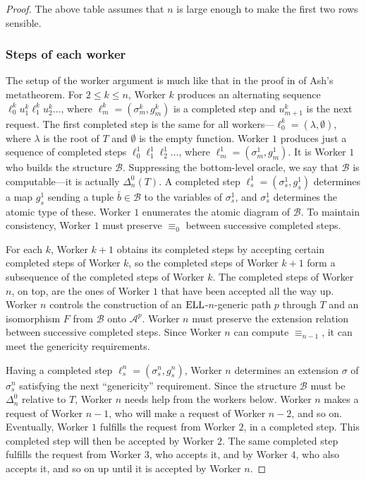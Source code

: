 \documentclass{article}
\newcommand{\ELL}{\textnormal{ELL}}
\theoremstyle{definition}
\begin{document}
\begin{proof}
		The above table assumes that $n$ is large enough to make the first two rows sensible.
		
		\subsubsection{Steps of each worker}
		
		The setup of the worker argument is much like that in the proof in \cite{AK00} of Ash's metatheorem. For $2\leq k\leq n$, Worker $k$ produces an alternating sequence 
		$\ell^k_0u^k_1\ell^k_1u^k_2\ldots $, where $\ell^k_m = (\sigma^k_m,g^k_m)$ is a completed step and $u^k_{m+1}$ is the next request. The first completed step is the same for all workers---$\ell^k_0 = (\lambda,\emptyset)$, where $\lambda$ is the root of $T$ and $\emptyset$ is the empty function.
		Worker $1$ produces just a sequence of completed steps $\ell^1_0\ell^1_1\ell^1_2\ldots$, where $\ell^1_m = (\sigma^1_m,g^1_m)$. It is Worker $1$ who builds the structure $\mathcal{B}$. Suppressing the bottom-level oracle, we say that $\mathcal{B}$ is computable---it is actually $\Delta^0_n(T)$. A completed step $\ell^1_s = (\sigma^1_s,g^1_s)$ determines a map $g^1_s$ sending a tuple $\bar{b}\in \mathcal{B}$ to the variables of $\sigma^1_s$, and $\sigma^1_s$ determines the atomic type of these. Worker $1$ enumerates the atomic diagram of $\mathcal{B}$. To maintain consistency, Worker $1$ must preserve $\equiv_0$ between successive completed steps.
		
		For each $k$, Worker $k+1$ obtains its completed steps by accepting certain completed steps of Worker $k$, so the completed steps of Worker $k+1$ form a subsequence of the completed steps of Worker $k$. The completed steps of Worker $n$, on top, are the ones of Worker $1$ that have been accepted all the way up. Worker $n$ controls the construction of an $\ELL$-$n$-generic path $p$ through $T$ and an isomorphism $F$ from $\mathcal{B}$ onto $\mathcal{A}^p$. Worker $n$ must preserve the extension relation between successive completed steps. Since Worker $n$ can compute $\equiv_{n-1}$, it can meet the genericity requirements. 
		
		Having a completed step $\ell_s^n = (\sigma^n_s,g^n_s)$, Worker $n$ determines an extension $\sigma$ of $\sigma^n_s$ satisfying the next ``genericity'' requirement. Since the structure $\mathcal{B}$ must be $\Delta^0_n$ relative to $T$, Worker $n$ needs help from the workers below. Worker $n$ makes a request of Worker $n-1$, who will make a request of Worker $n-2$, and so on. Eventually, Worker $1$ fulfills the request from Worker $2$, in a completed step. This completed step will then be accepted by Worker $2$. The same completed step fulfills the request from Worker $3$, who accepts it, and by Worker $4$, who also accepts it, and so on up until it is accepted by Worker $n$. 
		

\end{proof}
\end{document}
